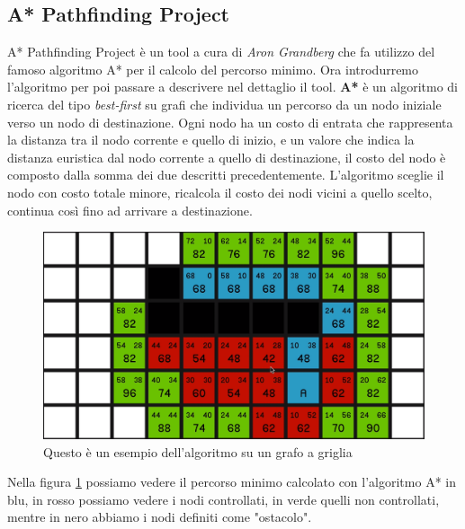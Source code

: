 \documentclass[12pt, openany]{book}
\begin{document}
	\subsection{A* Pathfinding Project}
		A* Pathfinding Project\cite{A*} è un tool a cura di \emph{Aron Grandberg} che fa utilizzo del famoso algoritmo A* per il calcolo del percorso minimo.
		Ora introdurremo l'algoritmo per poi passare a descrivere nel dettaglio il tool.
		\textbf{A*} è un algoritmo di ricerca del tipo \emph{best-first} su grafi che individua un percorso da un nodo iniziale verso un nodo di destinazione. Ogni nodo ha un costo di entrata che rappresenta la distanza tra il nodo corrente e quello di inizio, e un valore che indica la distanza euristica dal nodo corrente a quello di destinazione, il costo del nodo è composto dalla somma dei due descritti precedentemente. L'algoritmo sceglie il nodo con costo totale minore, ricalcola il costo dei nodi vicini a quello scelto, continua così fino ad arrivare a destinazione.
		\begin{figure}[H]
			\centering
			\includegraphics[width=1\linewidth]{"Immagini/AStar"}
			\caption{Questo è un esempio dell'algoritmo su un grafo a griglia}
			\label{fig:AStar}
		\end{figure}
		Nella figura \ref{fig:AStar} possiamo vedere il percorso minimo calcolato con l'algoritmo A* in blu, in rosso possiamo vedere i nodi controllati, in verde quelli non controllati, mentre in nero abbiamo i nodi definiti come "ostacolo". 
\end{document}
